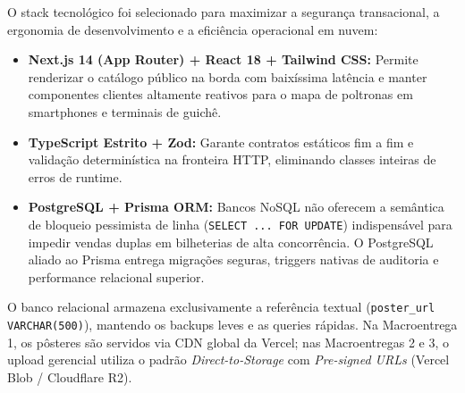 
O stack tecnológico foi selecionado para maximizar a segurança transacional, a ergonomia de desenvolvimento e a eficiência operacional em nuvem:

\begin{itemize}
\item \textbf{Next.js 14 (App Router) + React 18 + Tailwind CSS:} Permite renderizar o catálogo público na borda com baixíssima latência e manter componentes clientes altamente reativos para o mapa de poltronas em smartphones e terminais de guichê.
\item \textbf{TypeScript Estrito + Zod:} Garante contratos estáticos fim a fim e validação determinística na fronteira HTTP, eliminando classes inteiras de erros de runtime.
\item \textbf{PostgreSQL + Prisma ORM:} Bancos NoSQL não oferecem a semântica de bloqueio pessimista de linha (\texttt{SELECT \allowbreak\hspace{0pt plus 1pt}.\allowbreak\hspace{0pt plus 1pt}.\allowbreak\hspace{0pt plus 1pt}.\allowbreak\hspace{0pt plus 1pt} \allowbreak\hspace{0pt plus 1pt}FOR \allowbreak\hspace{0pt plus 1pt}UPDATE}) indispensável para impedir vendas duplas em bilheterias de alta concorrência. O PostgreSQL aliado ao Prisma entrega migrações seguras, triggers nativas de auditoria e performance relacional superior.
\end{itemize}


O banco relacional armazena exclusivamente a referência textual (\texttt{poster\_\allowbreak\hspace{0pt plus 1pt}url \allowbreak\hspace{0pt plus 1pt}VARCHAR(500)}), mantendo os backups leves e as queries rápidas. Na Macroentrega 1, os pôsteres são servidos via CDN global da Vercel; nas Macroentregas 2 e 3, o upload gerencial utiliza o padrão \emph{Direct-to-Storage} com \emph{Pre-signed URLs} (Vercel Blob / Cloudflare R2).



